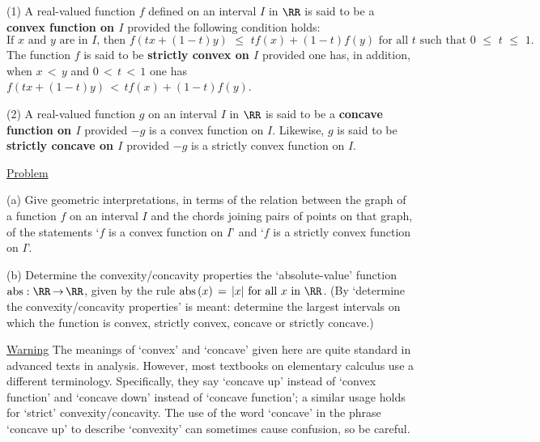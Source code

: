 \V
\V

\noindent {} (1) A real-valued function $f$ defined on an interval $I$ in ${\RR}$ is said to be a {\bf convex function on $I$} provided the following condition holds:
        \begin{displaymath}
        \mbox{If $x$ and $y$ are in $I$, then }
        f(tx + (1-t)y)\,\,{\leq}\,\,tf(x) + (1-t)f(y) \mbox{ for all $t$ such that $0\,\,{\leq}\,\,t\,\,{\leq}\,\,1$}.
        \end{displaymath}
    The function $f$ is said to be {\bf strictly convex on $I$} provided one has, in addition, when $x\,<\,y$ and $0\,<\,t\,<\,1$ one has
        $f(tx + (1-t)y)\,<\,tf(x) + (1-t)f(y)$.

        (2) A real-valued function $g$ on an interval $I$ in ${\RR}$ is said to be a {\bf concave function on $I$} provided $-g$ is a convex function on $I$.
    Likewise, $g$ is said to be {\bf strictly concave on $I$} provided $-g$ is  a strictly convex function on $I$.

\V

        \underline{Problem}

        (a) Give geometric interpretations, in terms of the relation between the graph of a function $f$ on an interval $I$ and the chords joining pairs of points on that graph,
    of the statements `$f$ is a convex function on $I$' and `$f$ is a strictly convex function on $I$'.

\V

        (b) Determine the convexity/concavity properties the `absolute-value' function $\mbox{abs}:{\RR} \,{\rightarrow}\, {\RR}$, given by the rule
        $\mbox{abs}\,(x) \,=\, |x| \mbox{ for all $x$ in ${\RR}$}$.
    (By `determine the convexity/concavity properties' is meant: determine the largest intervals on which the function is convex, strictly convex, concave or strictly concave.)

\V

        \underline{Warning} The meanings of `convex' and `concave' given here are quite standard in advanced texts in analysis.
    However, most textbooks on elementary calculus use a different terminology. 
    Specifically, they say `concave up' instead of `convex function' and `concave down' instead of `concave function';
    a similar usage holds for `strict' convexity/concavity.
    The use of the word `concave' in the phrase `concave up' to describe `convexity' can sometimes cause confusion, so be careful.

